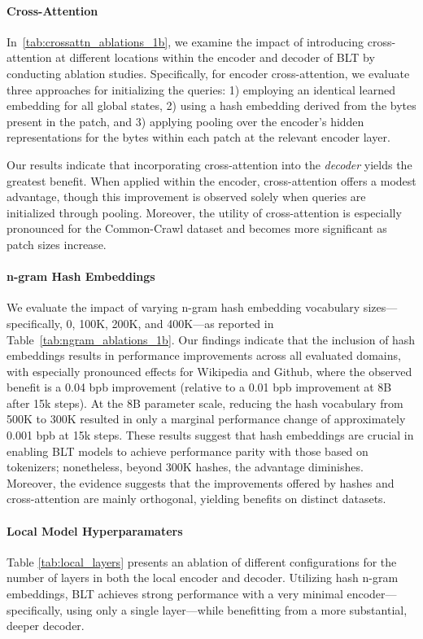 \paragraph{Cross-Attention} 
In~\autoref{tab:crossattn_ablations_1b}, we examine the impact of introducing cross-attention at different locations within the encoder and decoder of {\textsc BLT} by conducting ablation studies. Specifically, for encoder cross-attention, we evaluate three approaches for initializing the queries: 1) employing an identical learned embedding for all global states, 2) using a hash embedding derived from the bytes present in the patch, and 3) applying pooling over the encoder’s hidden representations for the bytes within each patch at the relevant encoder layer.

Our results indicate that incorporating cross-attention into the \textit{decoder} yields the greatest benefit. When applied within the encoder, cross-attention offers a modest advantage, though this improvement is observed solely when queries are initialized through pooling. Moreover, the utility of cross-attention is especially pronounced for the Common-Crawl dataset and becomes more significant as patch sizes increase.

\paragraph{n-gram Hash Embeddings} 

We evaluate the impact of varying n-gram hash embedding vocabulary sizes—specifically, 0, 100K, 200K, and 400K—as reported in Table~\ref{tab:ngram_ablations_1b}. Our findings indicate that the inclusion of hash embeddings results in performance improvements across all evaluated domains, with especially pronounced effects for Wikipedia and Github, where the observed benefit is a 0.04 bpb improvement (relative to a 0.01 bpb improvement at 8B after 15k steps). At the 8B parameter scale, reducing the hash vocabulary from 500K to 300K resulted in only a marginal performance change of approximately 0.001 bpb at 15k steps. These results suggest that hash embeddings are crucial in enabling {\textsc BLT} models to achieve performance parity with those based on tokenizers; nonetheless, beyond 300K hashes, the advantage diminishes. Moreover, the evidence suggests that the improvements offered by hashes and cross-attention are mainly orthogonal, yielding benefits on distinct datasets.

\paragraph{Local Model Hyperparamaters} Table \ref{tab:local_layers} presents an ablation of different configurations for the number of layers in both the local encoder and decoder. Utilizing hash n-gram embeddings, {\textsc BLT} achieves strong performance with a very minimal encoder—specifically, using only a single layer—while benefitting from a more substantial, deeper decoder.

